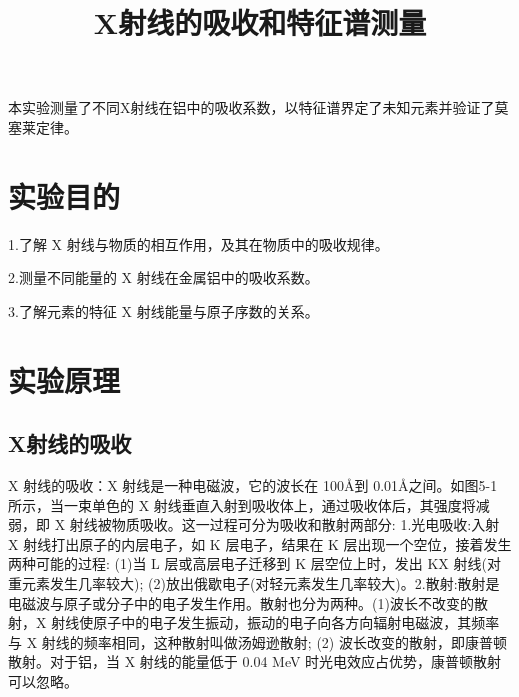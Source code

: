 \documentclass[hyperref]{ctexart}
\title{\textbf{X射线的吸收和特征谱测量}}
\author{\sffamily }
\date{}
\begin{document}
\maketitle
{}本实验测量了不同X射线在铝中的吸收系数，以特征谱界定了未知元素并验证了莫塞莱定律。\\	
	\section{实验目的}
	1.了解 X 射线与物质的相互作用，及其在物质中的吸收规律。

	2.测量不同能量的 X 射线在金属铝中的吸收系数。

	3.了解元素的特征 X 射线能量与原子序数的关系。
	\section{实验原理}
	\subsection{X射线的吸收}
	X 射线的吸收：X 射线是一种电磁波，它的波长在 100Å到 0.01Å之间。如图5-1 所示，当一束单色的 X 射线垂直入射到吸收体上，通过吸收体后，其强度将减弱，即 X 射线被物质吸收。这一过程可分为吸收和散射两部分: 1.光电吸收:入射 X 射线打出原子的内层电子，如 K 层电子，结果在 K 层出现一个空位，接着发生两种可能的过程: (1)当 L 层或高层电子迁移到 K 层空位上时，发出 KX 射线(对重元素发生几率较大); (2)放出俄歇电子(对轻元素发生几率较大)。2.散射:散射是电磁波与原子或分子中的电子发生作用。散射也分为两种。(1)波长不改变的散射，X 射线使原子中的电子发生振动，振动的电子向各方向辐射电磁波，其频率与 X 射线的频率相同，这种散射叫做汤姆逊散射; (2) 波长改变的散射，即康普顿散射。对于铝，当 X 射线的能量低于 0.04 MeV 时光电效应占优势，康普顿散射可以忽略。
\end{document}
